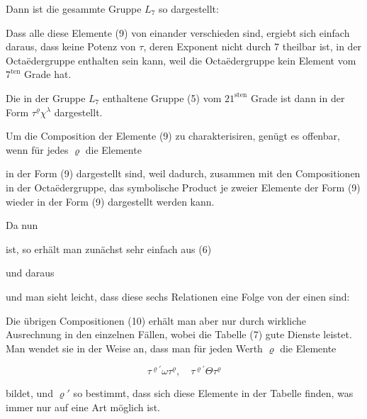 
Dann ist die gesammte Gruppe $L_7$ so dargestellt:


Dass alle diese Elemente (9) von einander verschieden sind, ergiebt sich einfach daraus, dass keine Potenz von $\tau$, deren Exponent nicht durch 7 theilbar ist, in der Octa\"edergruppe enthalten sein kann, weil die Octa\"edergruppe kein Element vom $7^{\text{ten}}$ Grade hat.

Die in der Gruppe $L_7$ enthaltene Gruppe (5) vom $21^{\text{sten}}$ Grade ist dann in der Form $\tau^\varrho \chi^\lambda$ dargestellt.

Um die Composition der Elemente (9) zu charakterisiren, genügt es offenbar, wenn für jedes $\varrho$ die Elemente


in der Form (9) dargestellt sind, weil dadurch, zusammen mit den Compositionen in der Octa\"edergruppe, das symbolische Product je zweier Elemente der Form (9) wieder in der Form (9) dargestellt werden kann.

Da nun


ist, so erhält man zunächst sehr einfach aus (6)


und daraus


und man sieht leicht, dass diese sechs Relationen eine Folge von der einen sind:


Die übrigen Compositionen (10) erhält man aber nur durch wirkliche Ausrechnung in den einzelnen Fällen, wobei die Tabelle (7) gute Dienste leistet. Man wendet sie in der Weise an, dass man für jeden Werth $\varrho$ die Elemente

\[
\tau^{\varrho'} \omega \tau^\varrho, \quad \tau^{\varrho'} \Theta \tau^\varrho
\]

bildet, und $\varrho'$ so bestimmt, dass sich diese Elemente in der Tabelle finden, was immer nur auf eine Art möglich ist.
